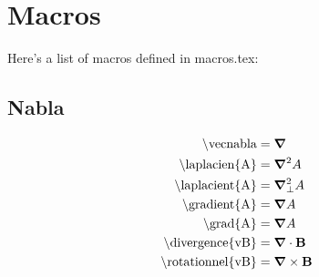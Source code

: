\section{Macros}

Here's a list of macros defined in macros.tex:

\subsection{Nabla}
\begin{subequations}
\begin{align}
\textrm{\textbackslash vecnabla}            & = \bm{\nabla}           \label{eqn:vnabla}      \\
\textrm{\textbackslash laplacien\{A\}}      & = \bm{\nabla}^2 A       \label{eqn:laplacien}   \\
\textrm{\textbackslash laplacient\{A\}}     & = \bm{\nabla}_{\bot}^{2} A      \label{eqn:laplacient}  \\
\textrm{\textbackslash gradient\{A\}}       & = \bm{\nabla} A        \label{eqn:gradient}    \\
\textrm{\textbackslash grad\{A\}}           & = \bm{\nabla} A            \label{eqn:grad}        \\
\textrm{\textbackslash divergence\{vB\}}    & = \bm{\nabla} \cdot \textbf{B}    \label{eqn:divergence}  \\
\textrm{\textbackslash rotationnel\{vB\}}   & = \bm{\nabla} \times \textbf{B}   \label{eqn:rotationnel}
\end{align}
\end{subequations}

